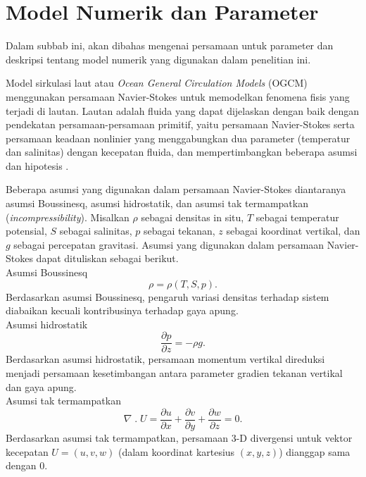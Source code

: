 \section[Model Numerik dan Parameter]{Model Numerik dan Parameter}
\begin{spacing}{1.5}
	\par Dalam subbab ini, akan dibahas mengenai persamaan untuk parameter dan deskripsi tentang model numerik yang digunakan dalam penelitian ini.
	
	Model sirkulasi laut atau \textit{Ocean General Circulation Models} (OGCM) menggunakan persamaan Navier-Stokes untuk memodelkan fenomena fisis yang terjadi di lautan. Lautan adalah fluida yang dapat dijelaskan dengan baik dengan pendekatan persamaan-persamaan primitif, yaitu persamaan Navier-Stokes serta persamaan keadaan nonlinier yang menggabungkan dua parameter (temperatur dan salinitas) dengan kecepatan fluida, dan mempertimbangkan beberapa asumsi dan hipotesis .
	
	Beberapa asumsi yang digunakan dalam persamaan Navier-Stokes diantaranya asumsi Boussinesq, asumsi hidrostatik, dan asumsi tak termampatkan (\textit{incompressibility}). Misalkan $\rho$ sebagai densitas in situ, $T$ sebagai temperatur potensial, $S$ sebagai salinitas, $p$ sebagai tekanan, $z$ sebagai koordinat vertikal, dan $g$ sebagai percepatan gravitasi. Asumsi yang digunakan dalam persamaan Navier-Stokes dapat dituliskan sebagai berikut.\\
	Asumsi Boussinesq
	\begin{equation}\label{eq:P1}
		\rho = \rho(T,S,p).
	\end{equation}
	Berdasarkan asumsi Boussinesq, pengaruh variasi densitas terhadap sistem diabaikan kecuali kontribusinya terhadap gaya apung.\\
	Asumsi hidrostatik
	\begin{equation}
		\frac{\partial p}{\partial z} = -\rho g.
	\end{equation}
	Berdasarkan asumsi hidrostatik, persamaan momentum vertikal direduksi menjadi persamaan kesetimbangan antara parameter gradien tekanan vertikal dan gaya apung.\\
	Asumsi tak termampatkan
	\begin{equation}
		\nabla \;.\; U =\frac{\partial u}{\partial x} + \frac{\partial v}{\partial y} + \frac{\partial w}{\partial z} = 0.
	\end{equation}	
	Berdasarkan asumsi tak termampatkan, persamaan 3-D divergensi untuk vektor kecepatan $U = (u,v,w)$ (dalam koordinat kartesius $(x,y,z)$) dianggap sama dengan 0.
	

\end{spacing}
